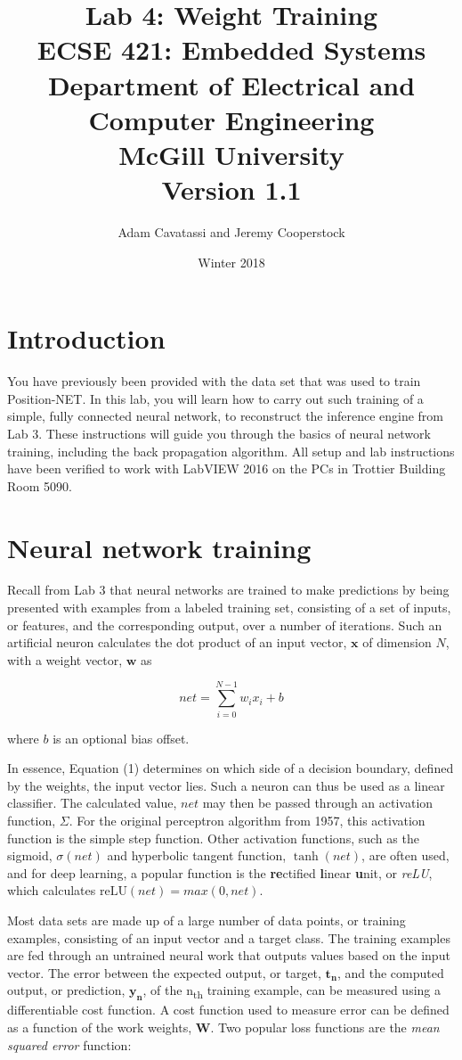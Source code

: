 \documentclass{article}
\title{Lab 4: Weight Training\\
  \large ECSE 421: Embedded Systems \\ Department of Electrical and Computer Engineering \\ McGill University \\ Version 1.1}
\author{Adam Cavatassi and Jeremy Cooperstock}
\date{Winter 2018}
\begin{document}
\maketitle

\section{Introduction}
You have previously been provided with the data set that was used to train Position-NET. In this lab, you will learn how to carry out such training of a simple, fully connected neural network, to reconstruct the inference engine from Lab 3. These instructions will guide you through the basics of neural network training, including the back propagation algorithm. All setup and lab instructions have been verified to work with LabVIEW 2016 on the PCs in Trottier Building Room 5090. 

\section{Neural network training}

Recall from Lab 3 that neural networks are trained to make predictions by being presented with examples from a labeled training set, consisting of a set of inputs, or features, and the corresponding output, over a number of iterations. Such an artificial neuron calculates the dot product of an input vector, $\mathbf{x}$ of dimension $N$, with a weight vector, $\mathbf{w}$ as

\begin{equation}
    net = \sum\limits_{i=0}^{N-1} w_i x_i + b
\end{equation}

where $b$ is an optional bias offset. 


In essence, Equation (1) determines on which side of a decision boundary, defined by the weights, the input vector lies.  Such a neuron can thus be used as a linear classifier. The calculated value, $net$ may then be passed through an activation function, $\Sigma$. For the original perceptron algorithm from 1957, this activation function is the simple step function. 
Other activation functions, such as the sigmoid, $\sigma(net)$ and hyperbolic tangent function, $\tanh(net)$, are often used, and for deep learning, a popular function is the \textbf{re}ctified \textbf{l}inear \textbf{u}nit, or \textit{reLU}, which calculates $\mathrm{reLU}(net) = max(0, net)$.


Most data sets are made up of a large number of data points, or training examples, consisting of an input vector and a target class. The training examples are fed through an untrained neural work that outputs values based on the input vector. The error between the expected output, or target, $\mathbf{t_n}$, and the computed output, or prediction, $\mathbf{y_n}$,
of the n\textsubscript{th} training example, can be measured using a differentiable cost function. A cost function used to measure error can be defined as a function of the work weights, $\mathbf{W}$. Two popular loss functions are the \textit{mean squared error} function:
\end{document}
